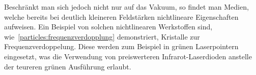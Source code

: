 Beschränkt man sich jedoch nicht nur auf das Vakuum, so findet man Medien, welche bereits bei deutlich kleineren Feldstärken nichtlineare Eigenschaften aufweisen.
Ein Beispiel von solchen nichtlinearen Werkstoffen sind, wie~\ref{particles:frequenzverdopplung} demonstriert, Kristalle zur Frequenzverdoppelung.
Diese werden zum Beispiel in grünen Laserpointern eingesetzt, was die Verwendung von preiswerteren Infrarot-Laserdioden anstelle der teureren grünen Ausführung erlaubt.
